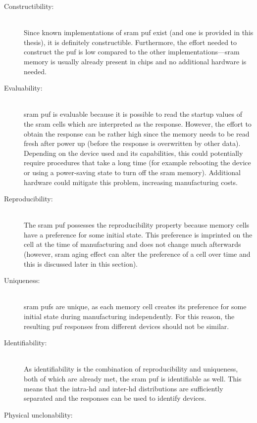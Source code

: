 \begin{description}
    \item[Constructibility:] \hfill \\
        Since known implementations of \gls{sram} \gls{puf} exist (and one is provided in this thesis), it is definitely constructible. Furthermore, the effort needed to construct the \gls{puf} is low compared to the other implementations---\gls{sram} memory is usually already present in chips and no additional hardware is needed.
    \item[Evaluability:] \hfill \\
        \gls{sram} \gls{puf} is evaluable because it is possible to read the startup values of the \gls{sram} cells which are interpreted as the response. However, the effort to obtain the response can be rather high since the memory needs to be read fresh after power up (before the response is overwritten by other data). Depending on the device used and its capabilities, this could potentially require procedures that take a long time (for example rebooting the device or using a power-saving state to turn off the \gls{sram} memory). Additional hardware could mitigate this problem, increasing manufacturing costs.
    \item[Reproducibility:] \hfill \\
        The \gls{sram} \gls{puf} possesses the reproducibility property because memory cells have a preference for some initial state. This preference is imprinted on the cell at the time of manufacturing and does not change much afterwards (however, \gls{sram} aging effect can alter the preference of a cell over time and this is discussed later in this section). %
    \item[Uniqueness:] \hfill \\
        \gls{sram} \glspl{puf} are unique, as each memory cell creates its preference for some initial state during manufacturing independently. For this reason, the resulting \gls{puf} responses from different devices should not be similar.
    \item[Identifiability:] \hfill \\
        As identifiability is the combination of reproducibility and uniqueness, both of which are already met, the \gls{sram} \gls{puf} is identifiable as well. This means that the intra-\gls{hd} and inter-\gls{hd} distributions are sufficiently separated and the responses can be used to identify devices.
    \item[Physical unclonability:] \hfill \\

\end{description}

